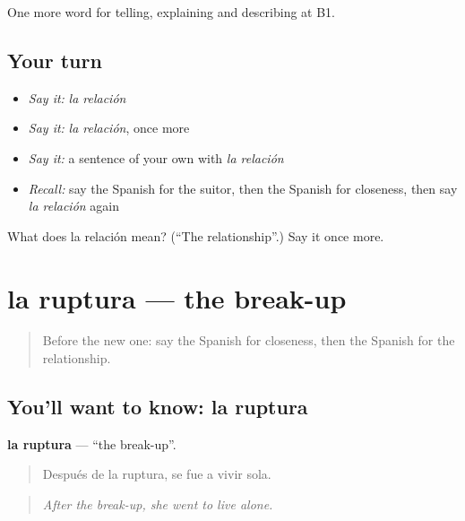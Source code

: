 \begin{grammarlens}[title={What you've built}]
One more word for telling, explaining and describing at B1.
\end{grammarlens}

\subsection*{Your turn}
\begin{itemize}
\raggedright
  \item \emph{Say it:} \emph{la relación}
  \item \emph{Say it:} \emph{la relación}, once more
  \item \emph{Say it:} a sentence of your own with \emph{la relación}
  \item \emph{Recall:} say the Spanish for the suitor, then the Spanish for closeness, then say \emph{la relación} again
\end{itemize}

\begin{tcolorbox}[breakable,colback=teal!4,colframe=teal!35!black,title={Before you move on}]
What does la relación mean? (\textquotedblleft{}The relationship\textquotedblright{}.) Say it once more.
\end{tcolorbox}
\section[la ruptura]{la ruptura — the break-up}

\label{lesson:ES-C745-ruptura}



\begin{quote}
Before the new one: say the Spanish for closeness, then the Spanish for the relationship.
\end{quote}

\subsection*{You'll want to know: la ruptura}
\textbf{la ruptura} — \textquotedblleft{}the break-up\textquotedblright{}.

\begin{quote}
Después de la ruptura, se fue a vivir sola.
\end{quote}

\begin{quote}
\emph{After the break-up, she went to live alone.}
\end{quote}

